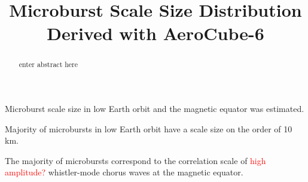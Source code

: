 \documentclass[draft]{agujournal2019}
\begin{document}
\title{Microburst Scale Size Distribution Derived with AeroCube-6}

%
%






\begin{keypoints}
\item Microburst scale size in low Earth orbit and the magnetic equator was estimated.
\item Majority of microbursts in low Earth orbit have a scale size on the order of 10 km.
\item The majority of microbursts correspond to the correlation scale of \textcolor{red}{high amplitude?} whistler-mode chorus waves at the magnetic equator.
\end{keypoints}

%
%


\begin{abstract}
enter abstract here

\end{abstract}
\end{document}
